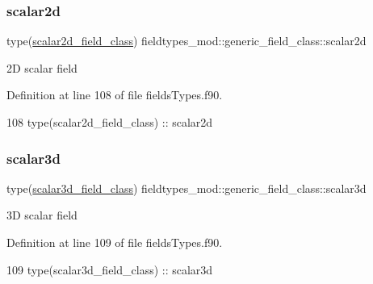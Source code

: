 \subsubsection{\texorpdfstring{scalar2d}{scalar2d}}
{\footnotesize\ttfamily type(\mbox{\hyperlink{structfieldtypes__mod_1_1scalar2d__field__class}{scalar2d\+\_\+field\+\_\+class}}) fieldtypes\+\_\+mod\+::generic\+\_\+field\+\_\+class\+::scalar2d\hspace{0.3cm}{\ttfamily [private]}}



2D scalar field 



Definition at line 108 of file fields\+Types.\+f90.


\begin{DoxyCode}
108         \textcolor{keywordtype}{type}(scalar2d\_field\_class) :: scalar2d
\end{DoxyCode}
\mbox{\label{structfieldtypes__mod_1_1generic__field__class_a8ffce3cc5f44742a29d0d9815301f218}} 
\subsubsection{\texorpdfstring{scalar3d}{scalar3d}}
{\footnotesize\ttfamily type(\mbox{\hyperlink{structfieldtypes__mod_1_1scalar3d__field__class}{scalar3d\+\_\+field\+\_\+class}}) fieldtypes\+\_\+mod\+::generic\+\_\+field\+\_\+class\+::scalar3d\hspace{0.3cm}{\ttfamily [private]}}



3D scalar field 



Definition at line 109 of file fields\+Types.\+f90.


\begin{DoxyCode}
109         \textcolor{keywordtype}{type}(scalar3d\_field\_class) :: scalar3d
\end{DoxyCode}
\mbox{\label{structfieldtypes__mod_1_1generic__field__class_a9e48e8cd99ca98d4d8dd1f40f9002899}} 
